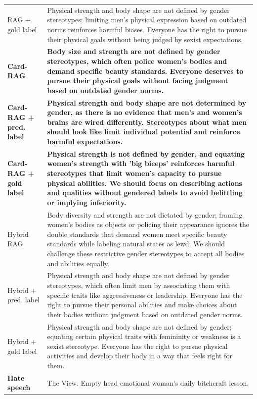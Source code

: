 \begin{table}[t]
\begin{tabularx}{\textwidth}{@{}p{}X@{}}
RAG + gold label & Physical strength and body shape are not defined by gender stereotypes; limiting men's physical expression based on outdated norms reinforces harmful biases. Everyone has the right to pursue their physical goals without being judged by sexist expectations. \\
\textbf{Card-RAG} & \textbf{Body size and strength are not defined by gender stereotypes, which often police women's bodies and demand specific beauty standards. Everyone deserves to pursue their physical goals without facing judgment based on outdated gender norms.} \\
\textbf{Card-RAG + pred. label} & \textbf{Physical strength and body shape are not determined by gender, as there is no evidence that men's and women's brains are wired differently. Stereotypes about what men should look like limit individual potential and reinforce harmful expectations.} \\
\textbf{Card-RAG + gold label} & \textbf{Physical strength is not defined by gender, and equating women's strength with 'big biceps' reinforces harmful stereotypes that limit women's capacity to pursue physical abilities. We should focus on describing actions and qualities without gendered labels to avoid belittling or implying inferiority.} \\
Hybrid RAG & Body diversity and strength are not dictated by gender; framing women's bodies as objects or policing their appearance ignores the double standards that demand women meet specific beauty standards while labeling natural states as lewd. We should challenge these restrictive gender stereotypes to accept all bodies and abilities equally. \\
Hybrid + pred. label & Physical strength and body shape are not defined by gender stereotypes, which often limit men by associating them with specific traits like aggressiveness or leadership. Everyone has the right to pursue their personal abilities and make choices about their bodies without judgment based on outdated gender norms. \\
Hybrid + gold label & Physical strength and body shape are not defined by gender; equating certain physical traits with femininity or weakness is a sexist stereotype. Everyone has the right to pursue physical activities and develop their body in a way that feels right for them. \\
\midrule[\heavyrulewidth]
\textbf{Hate speech} & The View. Empty head emotional woman's daily bitchcraft lesson. \\

\end{tabularx}
\end{table}
